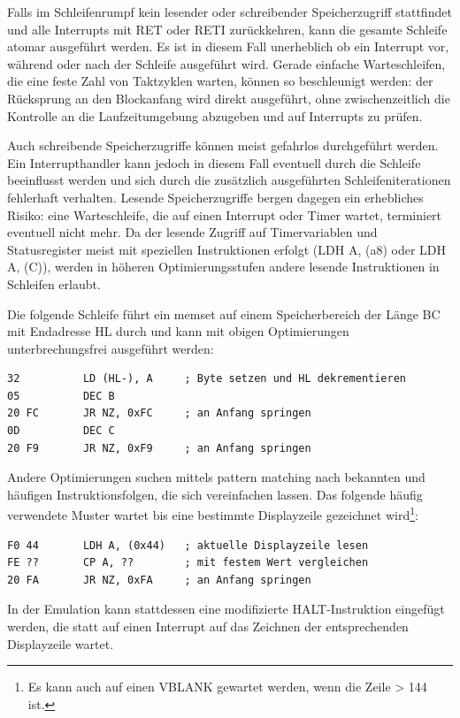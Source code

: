 \documentclass[a4paper]{scrartcl}
\begin{document}
Falls im Schleifenrumpf kein lesender oder schreibender Speicherzugriff stattfindet und alle Interrupts mit RET oder RETI zurückkehren, kann die gesamte Schleife atomar ausgeführt werden. Es ist in diesem Fall unerheblich ob ein Interrupt vor, während oder nach der Schleife ausgeführt wird. Gerade einfache Warteschleifen, die eine feste Zahl von Taktzyklen warten, können so beschleunigt werden: der Rücksprung an den Blockanfang wird direkt ausgeführt, ohne zwischenzeitlich die Kontrolle an die Laufzeitumgebung abzugeben und auf Interrupts zu prüfen.

Auch schreibende Speicherzugriffe können meist gefahrlos durchgeführt werden. Ein Interrupthandler kann jedoch in diesem Fall eventuell durch die Schleife beeinflusst werden und sich durch die zusätzlich ausgeführten Schleifeniterationen fehlerhaft verhalten. Lesende Speicherzugriffe bergen dagegen ein erhebliches Risiko: eine Warteschleife, die auf einen Interrupt oder Timer wartet, terminiert eventuell nicht mehr. Da der lesende Zugriff auf Timervariablen und Statusregister meist mit speziellen Instruktionen erfolgt (LDH A, (a8) oder LDH A, (C)), werden in höheren Optimierungsstufen andere lesende Instruktionen in Schleifen erlaubt.

Die folgende Schleife führt ein memset auf einem Speicherbereich der Länge BC mit Endadresse HL durch und kann mit obigen Optimierungen unterbrechungsfrei ausgeführt werden:

\begin{lstlisting}
32			LD (HL-), A		; Byte setzen und HL dekrementieren
05			DEC B
20 FC		JR NZ, 0xFC		; an Anfang springen
0D			DEC C
20 F9		JR NZ, 0xF9		; an Anfang springen
\end{lstlisting}

Andere Optimierungen suchen mittels pattern matching nach bekannten und häufigen Instruktionsfolgen, die sich vereinfachen lassen. Das folgende häufig verwendete Muster wartet bis eine bestimmte Displayzeile gezeichnet wird\footnote{Es kann auch auf einen VBLANK gewartet werden, wenn die Zeile > 144 ist.}:

\begin{lstlisting}
F0 44		LDH A, (0x44)	; aktuelle Displayzeile lesen
FE ??		CP A, ??		; mit festem Wert vergleichen
20 FA		JR NZ, 0xFA		; an Anfang springen
\end{lstlisting}

In der Emulation kann stattdessen eine modifizierte HALT-Instruktion eingefügt werden, die statt auf einen Interrupt auf das Zeichnen der entsprechenden Displayzeile wartet.
\end{document}
